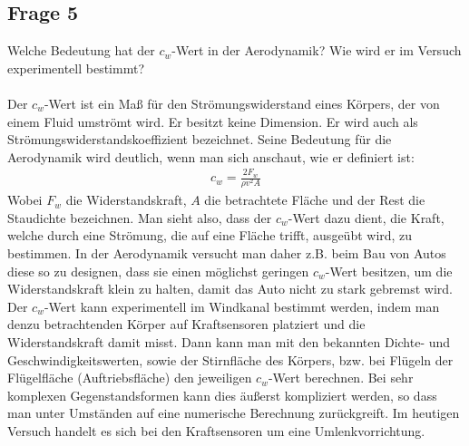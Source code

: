 \documentclass[a4paper,10pt]{scrartcl}
\begin{document}
		\subsection{Frage 5}
			Welche Bedeutung hat der \(c_{w}\)-Wert in der Aerodynamik? Wie wird er im Versuch experimentell
			bestimmt?\\
			\\
			Der \(c_{w}\)-Wert ist ein Maß für den Strömungswiderstand eines Körpers, der von einem Fluid umströmt wird. Er besitzt keine Dimension. Er wird auch als Strömungswiderstandskoeffizient bezeichnet. Seine Bedeutung für die Aerodynamik wird deutlich, wenn man sich anschaut, wie er definiert ist:
			\begin{align*}
			c_{w}=\frac{2F_{w}}{\rho v^{2}A}
			\end{align*}
			Wobei \(F_{w}\) die Widerstandskraft, \(A\) die betrachtete Fläche und der Rest die Staudichte bezeichnen. Man sieht also, dass der \(c_{w}\)-Wert dazu dient, die Kraft, welche durch eine Strömung, die auf eine Fläche trifft, ausgeübt wird, zu bestimmen. In der Aerodynamik versucht man daher z.B. beim Bau von Autos diese so zu designen, dass sie einen möglichst geringen \(c_{w}\)-Wert besitzen, um die Widerstandskraft klein zu halten, damit das Auto nicht zu stark gebremst wird.\\
			Der \(c_{w}\)-Wert kann experimentell im Windkanal bestimmt werden, indem man denzu betrachtenden Körper auf Kraftsensoren platziert und die Widerstandskraft damit misst. Dann kann man mit den bekannten Dichte- und Geschwindigkeitswerten, sowie der Stirnfläche des Körpers, bzw. bei Flügeln der Flügelfläche (Auftriebsfläche) den jeweiligen \(c_{w}\)-Wert berechnen. Bei sehr komplexen Gegenstandsformen kann dies äußerst kompliziert werden, so dass man unter Umständen auf eine numerische Berechnung zurückgreift. Im heutigen Versuch handelt es sich bei den Kraftsensoren um eine Umlenkvorrichtung.
			
\end{document}
